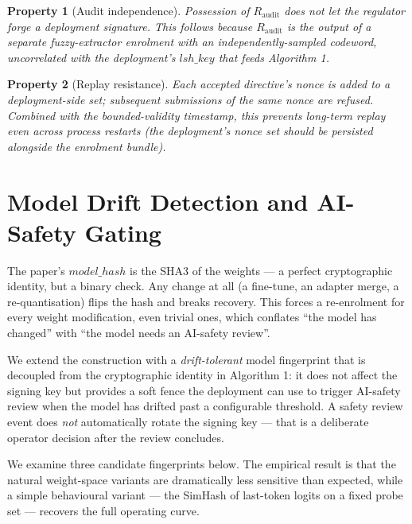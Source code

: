\documentclass[11pt,a4paper]{article}
\newtheorem{property}{Property}
\begin{document}
\begin{property}[Audit independence]
  Possession of $R_{\mathrm{audit}}$ does not let the regulator
  forge a deployment signature.  This follows because $R_{\mathrm{audit}}$
  is the output of a \emph{separate} fuzzy\nobreakdash-extractor
  enrolment with an independently\nobreakdash-sampled codeword,
  uncorrelated with the deployment's $\mathit{lsh\_key}$ that
  feeds Algorithm 1.
\end{property}

\begin{property}[Replay resistance]
  Each accepted directive's nonce is added to a deployment\nobreakdash-side
  set; subsequent submissions of the same nonce are refused.
  Combined with the bounded\nobreakdash-validity timestamp, this
  prevents long\nobreakdash-term replay even across process restarts
  (the deployment's nonce set should be persisted alongside the
  enrolment bundle).
\end{property}

\section{Model Drift Detection and AI-Safety Gating}
\label{sec:model}

The paper's $\mathit{model\_hash}$ is the SHA3 of the
weights — a perfect cryptographic identity, but a binary check.
Any change at all (a fine\nobreakdash-tune, an adapter merge, a
re\nobreakdash-quantisation) flips the hash and breaks recovery.  This
forces a re\nobreakdash-enrolment for every weight modification, even
trivial ones, which conflates ``the model has changed'' with ``the
model needs an AI\nobreakdash-safety review''.

We extend the construction with a \emph{drift\nobreakdash-tolerant}
model fingerprint that is decoupled from the cryptographic identity
in Algorithm 1: it does not affect the signing key but provides a
soft fence the deployment can use to trigger AI\nobreakdash-safety
review when the model has drifted past a configurable threshold.
A safety review event does \emph{not} automatically rotate the
signing key — that is a deliberate operator decision after the
review concludes.

We examine three candidate fingerprints below.  The empirical
result is that the natural weight\nobreakdash-space variants are
dramatically less sensitive than expected, while a simple
behavioural variant — the SimHash of last\nobreakdash-token logits on a
fixed probe set — recovers the full operating curve.
\end{document}

